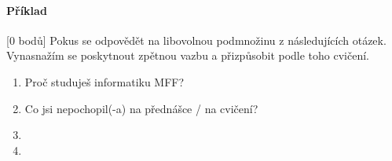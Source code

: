 \documentclass[a4paper,10pt]{article}
\author{Karel Král}
\begin{document}
\pagestyle{fancy}


\paragraph{Příklad}[0 bodů]
Pokus se odpovědět na libovolnou podmnožinu z následujících otázek.
Vynasnažím se poskytnout zpětnou vazbu a přizpůsobit podle toho cvičení.
\begin{enumerate}
	\item  Proč studuješ informatiku MFF?
	\item  Co jsi nepochopil(-a) na přednášce / na cvičení?
	\item  
	\item  
\end{enumerate}
\end{document}
